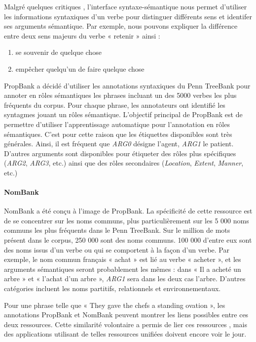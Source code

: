 Malgré quelques critiques \citep{riemer2011conception}, l'interface
syntaxe-sémantique nous permet d'utiliser les informations syntaxiques d'un
verbe pour distinguer différents sens et identifer ses arguments sémantique.
Par exemple, nous pouvons expliquer la différence entre deux sens majeurs du
verbe « retenir » ainsi :

\begin{enumerate}
    \item se souvenir de quelque chose
    \item empêcher quelqu'un de faire quelque chose
\end{enumerate}

PropBank \citep{palmer2005proposition} a décidé d'utiliser les annotations
syntaxiques du Penn TreeBank \citep{marcus1993building} pour annoter en rôles
sémantiques les phrases incluant un des 5000 verbes les plus fréquents du
corpus. Pour chaque phrase, les annotateurs ont identifié les syntagmes jouant
un rôles sémantique. L'objectif principal de PropBank est de permettre
d'utiliser l'apprentissage automatique pour l'annotation en rôles sémantiques.
C'est pour cette raison que les étiquettes disponibles sont très générales.
Ainsi, il est fréquent que \textit{ARG0} désigne l'agent, \textit{ARG1} le
patient. D'autres arguments sont disponibles pour étiqueter des rôles plus
spécifiques (\textit{ARG2}, \textit{ARG3}, etc.) ainsi que des rôles
secondaires (\textit{Location}, \textit{Extent}, \textit{Manner}, etc.)

\paragraph{NomBank}

NomBank \citep{meyers2004nombank} a été conçu à l'image de PropBank. La
spécificité de cette ressource est de se concentrer sur les noms communs, plus
particulièrement sur les 5 000 noms communs les plus fréquents dans le Penn
TreeBank. Sur le million de mots présent dans le corpus, 250 000 sont des noms
communs. 100 000 d'entre eux sont des noms issus d'un verbe ou qui se
comportent à la façon d'un verbe. Par exemple, le nom commun français « achat »
est lié au verbe « acheter », et les arguments sémantiques seront probablement
les mêmes : dans « Il a acheté un arbre » et « l'achat d'un arbre »,
\textit{ARG1} sera dans les deux cas l'arbre. D'autres catégories incluent les
noms partitifs, relationnels et environnementaux.

Pour une phrase telle que « They gave the chefs a standing ovation », les
annotations PropBank et NomBank peuvent montrer les liens possibles entre ces
deux ressources. Cette similarité volontaire a permis de lier ces ressources
\citep{pustejovsky2005merging,verhagen2007combining}, mais des applications
utilisant de telles ressources unifiées doivent encore voir le jour.

